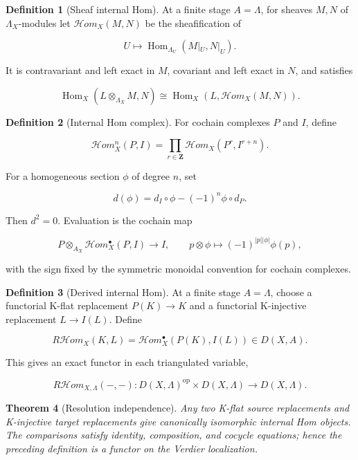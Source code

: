 \documentclass[10pt]{article}
\newtheorem{theorem}{Theorem}[section]
\theoremstyle{definition}
\newtheorem{definition}[theorem]{Definition}
\newcommand{\RHom}{R\mathcal Hom}
\begin{document}
\begin{definition}[Sheaf internal Hom]
At a finite stage \(A=\Lambda\), for sheaves \(M,N\) of
\(\Lambda_X\)-modules let
\(\mathcal Hom_X(M,N)\) be the sheafification of

\[
 U\longmapsto
 \operatorname{Hom}_{\Lambda_U}(M|_U,N|_U).
\]

It is contravariant and left exact in \(M\), covariant and left exact in
\(N\), and satisfies

\[
 \operatorname{Hom}_X(L\otimes_{\Lambda_X}M,N)
 \cong
 \operatorname{Hom}_X(L,\mathcal Hom_X(M,N)).
\]
\end{definition}

\begin{definition}[Internal Hom complex]
For cochain complexes \(P\) and \(I\), define

\[
 \mathcal Hom_X^n(P,I)=
 \prod_{r\in\mathbf Z}\mathcal Hom_X(P^r,I^{r+n}).
\]

For a homogeneous section \(\phi\) of degree \(n\), set

\[
 d(\phi)=d_I\circ\phi-(-1)^n\phi\circ d_P.
\]

Then \(d^2=0\).  Evaluation is the cochain map

\[
 P\otimes_{A_X}\mathcal Hom_X^\bullet(P,I)\longrightarrow I,
 \qquad p\otimes\phi\longmapsto(-1)^{|p||\phi|}\phi(p),
\]

with the sign fixed by the symmetric monoidal convention for cochain
complexes.
\end{definition}

\begin{definition}[Derived internal Hom]
At a finite stage \(A=\Lambda\), choose a functorial K-flat replacement
\(P(K)\to K\) and a functorial
K-injective replacement \(L\to I(L)\).  Define

\[
 \RHom_X(K,L)=\mathcal Hom_X^\bullet(P(K),I(L))
 \in D(X,A).
\]

This gives an exact functor in each triangulated variable,

\[
 \RHom_{X,\Lambda}(-,-):D(X,\Lambda)^{\mathrm{op}}
 \times D(X,\Lambda)\longrightarrow D(X,\Lambda).
\]
\end{definition}

\begin{theorem}[Resolution independence]
Any two K-flat source replacements and K-injective target replacements give
canonically isomorphic internal Hom objects.  The comparisons satisfy
identity, composition, and cocycle equations; hence the preceding definition
is a functor on the Verdier localization.
\end{theorem}
\end{document}
